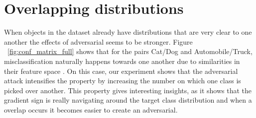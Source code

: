 \section{Overlapping distributions}
When objects in the dataset already have distributions that are very clear to one another the effects of adversarial seems to be stronger. Figure ~\ref{fig:conf_matrix_full} shows that for the pairs Cat/Dog and Automobile/Truck, misclassification naturally happens towards one another due to similarities in their feature space \cite{stanford2016}. On this case, our experiment shows that the adversarial attack intensifies the property by increasing the number on which one class is picked over another. This property gives interesting insights, as it shows that the gradient sign is really navigating around the target class distribution and when a overlap occurs it becomes easier to create an adversarial.

